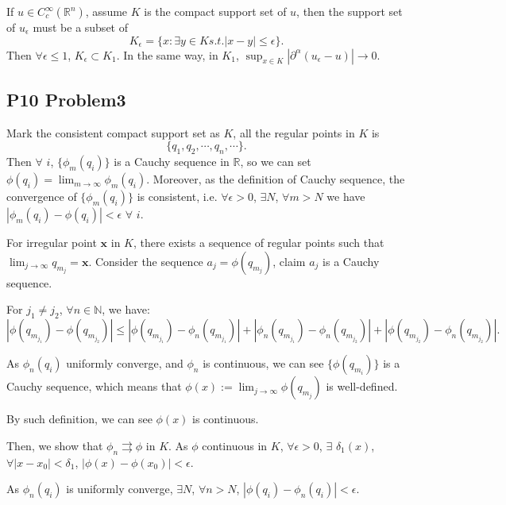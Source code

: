 \documentclass[a4paper]{ctexart}
\begin{document}
If $u\in C_{c}^{\infty}(\mathbb{R}^{n})$, assume $K$ is the compact support set of $u$, then the support set of $u_{\epsilon}$ must be a subset of 
\begin{equation}
    K_{\epsilon}=\{x:\exists y\in K s.t. |x-y|\leqslant\epsilon\}.
\end{equation}
Then $\forall\epsilon\leqslant 1$, $K_\epsilon\subset K_{1}$. In the same way, in $K_{1}$, $\sup_{x\in K}|\partial^{\alpha}(u_{\epsilon}-u)|\rightarrow 0$.
\subsection*{P10 Problem3}
Mark the consistent compact support set as $K$, all the regular points in $K$ is 
\begin{equation}
    \{q_{1},q_{2},\cdots,q_{n},\cdots\}.
\end{equation}
Then $\forall$ $i$, $\{\phi_{m}(q_{i})\}$ is a Cauchy sequence in $\mathbb{R}$, so we can set 
$\phi(q_{i})=\lim_{m\rightarrow\infty}\phi_{m}(q_{i})$. Moreover, as the definition of Cauchy sequence, 
the convergence of $\{\phi_{m}(q_{i})\}$ is consistent, i.e. $\forall\epsilon>0$, $\exists N$, 
$\forall m>N$ we have $|\phi_{m}(q_{i})-\phi(q_{i})|<\epsilon$ $\forall$ $i$.

For irregular point $\mathbf{x}$ in $K$, there exists a sequence of regular points such that $\lim_{j\rightarrow\infty}q_{m_{j}}=\mathbf{x}$. 
Consider the sequence $a_{j}=\phi(q_{m_{j}})$, claim $a_{j}$ is a Cauchy sequence.

For $j_{1}\neq j_{2}$, $\forall n\in\mathbb{N}$, we have:
\begin{equation}
    |\phi(q_{m_{j_{1}}})-\phi(q_{m_{j_{2}}})|\leqslant|\phi(q_{m_{j_1}})-\phi_{n}(q_{m_{j_1}})|+|\phi_{n}(q_{m_{j_{1}}})-\phi_{n}(q_{m_{j_2}})|+|\phi(q_{m_{j_2}})-\phi_{n}(q_{m_{j_{2}}})|.
\end{equation}

As $\phi_{n}(q_{i})$ uniformly converge, and $\phi_{n}$ is continuous, we can see $\{\phi(q_{m_{i}})\}$ is a Cauchy sequence, which means that $\phi(x):=\lim_{j\rightarrow\infty}\phi(q_{m_{j}})$ is well-defined.

By such definition, we can see $\phi(x)$ is continuous.

Then, we show that $\phi_{n}\rightrightarrows\phi$ in $K$. As $\phi$ continuous in $K$, $\forall\epsilon>0$, $\exists$ $\delta_{1}(x)$, $\forall |x-x_{0}|<\delta_{1}$, $|\phi(x)-\phi(x_{0})|<\epsilon$.

As $\phi_{n}(q_{i})$ is uniformly converge, $\exists N$, $\forall n>N$, $|\phi(q_{i})-\phi_{n}(q_{i})|<\epsilon$.
\end{document}
